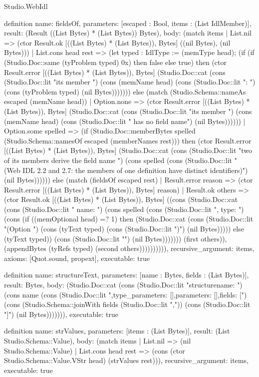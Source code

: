 \begin{lexlean}{Studio.WebIdl}
\begin{semanticmodule}
{{definition{
  name: fieldsOf,
  parameters: [escaped : Bool, items : (List IdlMember)],
  result: (Result ((List Bytes) * (List Bytes)) Bytes),
  body: (match items
    | List.nil => (ctor Result.ok [((List Bytes) * (List Bytes)), Bytes] ((nil Bytes), (nil Bytes)))
    | List.cons head rest => (let typed : IdlType := (memType head); (if (if (Studio.Doc::same (tyProblem typed) 0x) then false else true) then (ctor Result.error [((List Bytes) * (List Bytes)), Bytes] (Studio.Doc::cat (cons (Studio.Doc::lit "its member ") (cons (memName head) (cons (Studio.Doc::lit ": ") (cons (tyProblem typed) (nil Bytes))))))) else (match (Studio.Schema::nameAs escaped (memName head))
    | Option.none => (ctor Result.error [((List Bytes) * (List Bytes)), Bytes] (Studio.Doc::cat (cons (Studio.Doc::lit "its member ") (cons (memName head) (cons (Studio.Doc::lit " has no field name") (nil Bytes))))))
    | Option.some spelled => (if (Studio.Doc::memberBytes spelled (Studio.Schema::namesOf escaped (memberNames rest))) then (ctor Result.error [((List Bytes) * (List Bytes)), Bytes] (Studio.Doc::cat (cons (Studio.Doc::lit "two of its members derive the field name ") (cons spelled (cons (Studio.Doc::lit " (Web IDL 2.2 and 2.7: the members of one definition have distinct identifiers)") (nil Bytes)))))) else (match (fieldsOf escaped rest)
    | Result.error reason => (ctor Result.error [((List Bytes) * (List Bytes)), Bytes] reason)
    | Result.ok others => (ctor Result.ok [((List Bytes) * (List Bytes)), Bytes] ((cons (Studio.Doc::cat (cons (Studio.Doc::lit "    {name: ") (cons spelled (cons (Studio.Doc::lit ", type: ") (cons (if ((memOptional head) =? 1) then (Studio.Doc::cat (cons (Studio.Doc::lit "(Option ") (cons (tyText typed) (cons (Studio.Doc::lit ")") (nil Bytes))))) else (tyText typed)) (cons (Studio.Doc::lit "}") (nil Bytes))))))) (first others)), (appendBytes (tyRefs typed) (second others)))))))))),
  recursive_argument: items,
  axioms: [Quot.sound, propext],
  executable: true
}

definition{
  name: structureText,
  parameters: [name : Bytes, fields : (List Bytes)],
  result: Bytes,
  body: (Studio.Doc::cat (cons (Studio.Doc::lit "structure{\n  name: ") (cons name (cons (Studio.Doc::lit ",\n  type_parameters: [],\n  parameters: [],\n  fields: [\n") (cons (Studio.Schema::joinWith fields (Studio.Doc::lit ",\n")) (cons (Studio.Doc::lit "\n  ]\n}\n") (nil Bytes))))))),
  executable: true
}

definition{
  name: strValues,
  parameters: [items : (List Bytes)],
  result: (List Studio.Schema::Value),
  body: (match items
    | List.nil => (nil Studio.Schema::Value)
    | List.cons head rest => (cons (ctor Studio.Schema::Value.VStr head) (strValues rest))),
  recursive_argument: items,
  executable: true
}

}}
\end{semanticmodule}
\end{lexlean}
